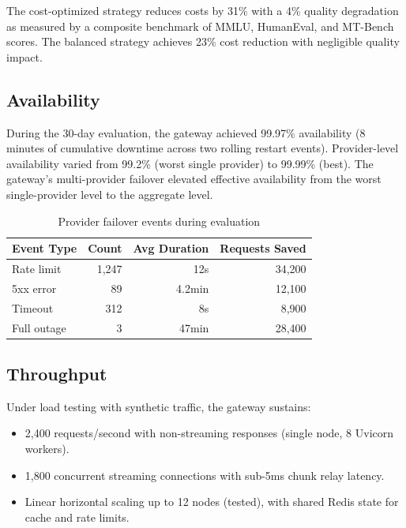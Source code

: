 The cost-optimized strategy reduces costs by 31\% with a 4\% quality degradation as measured by a composite benchmark of MMLU, HumanEval, and MT-Bench scores. The balanced strategy achieves 23\% cost reduction with negligible quality impact.

\subsection{Availability}

During the 30-day evaluation, the gateway achieved 99.97\% availability (8 minutes of cumulative downtime across two rolling restart events). Provider-level availability varied from 99.2\% (worst single provider) to 99.99\% (best). The gateway's multi-provider failover elevated effective availability from the worst single-provider level to the aggregate level.

\begin{table}[t]
\centering
\caption{Provider failover events during evaluation}
\label{tab:failover}
\begin{tabular}{@{}lrrr@{}}
\toprule
\textbf{Event Type} & \textbf{Count} & \textbf{Avg Duration} & \textbf{Requests Saved} \\
\midrule
Rate limit & 1,247 & 12s & 34,200 \\
5xx error & 89 & 4.2min & 12,100 \\
Timeout & 312 & 8s & 8,900 \\
Full outage & 3 & 47min & 28,400 \\
\bottomrule
\end{tabular}
\end{table}

\subsection{Throughput}

Under load testing with synthetic traffic, the gateway sustains:

\begin{itemize}[leftmargin=*]
    \item 2,400 requests/second with non-streaming responses (single node, 8 Uvicorn workers).
    \item 1,800 concurrent streaming connections with sub-5ms chunk relay latency.
    \item Linear horizontal scaling up to 12 nodes (tested), with shared Redis state for cache and rate limits.
\end{itemize}

